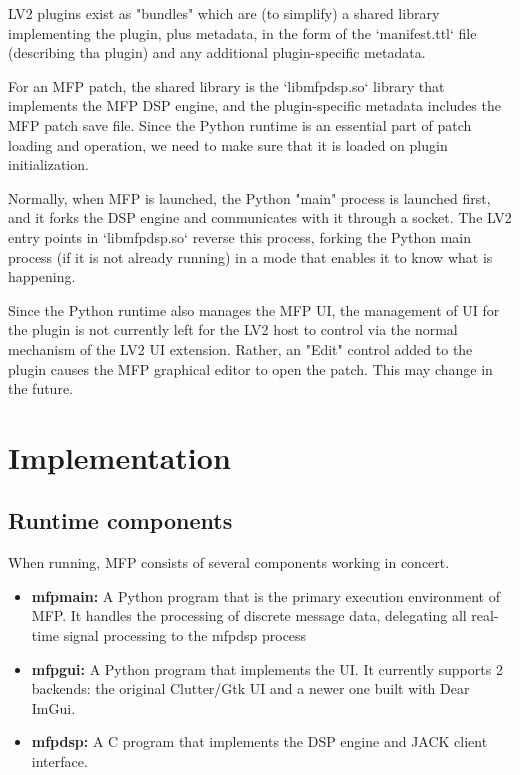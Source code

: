 \documentclass[a4paper]{article}
\begin{document}
LV2 plugins exist as "bundles" which are (to simplify) a shared
library implementing the plugin, plus metadata, in the form of
the `manifest.ttl` file (describing tha plugin) and any
additional plugin-specific metadata.

For an MFP patch, the shared library is the `libmfpdsp.so`
library that implements the MFP DSP engine, and the
plugin-specific metadata includes the MFP patch save file. Since
the Python runtime is an essential part of patch loading and
operation, we need to make sure that it is loaded on plugin
initialization.

Normally, when MFP is launched, the Python "main" process is
launched first, and it forks the DSP engine and communicates with
it through a socket. The LV2 entry points in `libmfpdsp.so`
reverse this process, forking the Python main process (if it is
not already running) in a mode that enables it to know what is
happening.

Since the Python runtime also manages the MFP UI, the management
of UI for the plugin is not currently left for the LV2 host to
control via the normal mechanism of the LV2 UI extension. Rather,
an "Edit" control added to the plugin causes the MFP graphical editor to
open the patch. This may change in the future.


\section{Implementation}

\subsection{Runtime components}

When running, MFP consists of several components working in concert.

\begin{itemize}
\item[]
{\bf mfpmain:} A Python program that is the primary execution
environment of MFP. It handles the processing of discrete
message data, delegating all real-time signal processing to the
mfpdsp process

\item[]
{\bf mfpgui:} A Python program that implements the UI. It currently
supports 2 backends: the original Clutter/Gtk UI and a newer one
built with Dear ImGui.

\item[]
{\bf mfpdsp:} A C program that implements the DSP engine and JACK
client interface.
\end{itemize}
\end{document}
